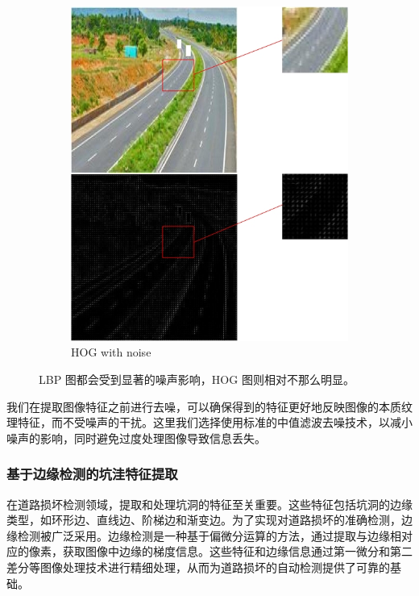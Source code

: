 \documentclass[a4paper, 10pt]{article}
\begin{document}
\begin{figure}[htbp]
\begin{subfigure}{0.3\textwidth}
			\includegraphics[width=\linewidth]{picture/HOG noise}
			\caption{HOG with noise}
			\label{fig: HOG noise}
		\end{subfigure}	
		
		\caption{
			\label{fig: HOG and LBP noise}
			LBP 图都会受到显著的噪声影响，HOG 图则相对不那么明显。
		}
	\end{figure}
	
	我们在提取图像特征之前进行去噪，可以确保得到的特征更好地反映图像的本质纹理特征，而不受噪声的干扰。这里我们选择使用标准的中值滤波去噪技术，以减小噪声的影响，同时避免过度处理图像导致信息丢失。
	
	
	\subsubsection{基于边缘检测的坑洼特征提取}
	
	在道路损坏检测领域，提取和处理坑洞的特征至关重要。这些特征包括坑洞的边缘类型，如环形边、直线边、阶梯边和渐变边。为了实现对道路损坏的准确检测，边缘检测被广泛采用。边缘检测是一种基于偏微分运算的方法，通过提取与边缘相对应的像素，获取图像中边缘的梯度信息。这些特征和边缘信息通过第一微分和第二差分等图像处理技术进行精细处理，从而为道路损坏的自动检测提供了可靠的基础。
	
\end{document}
